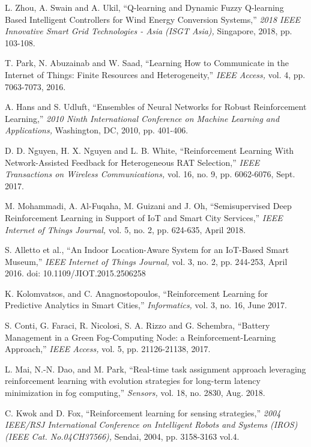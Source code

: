 \documentclass[journal]{IEEEtran}
\begin{document}
\begin{thebibliography}{1}
L. Zhou, A. Swain and A. Ukil, ``Q-learning and Dynamic Fuzzy Q-learning Based Intelligent Controllers for Wind Energy Conversion Systems,'' \emph{2018 IEEE Innovative Smart Grid Technologies - Asia (ISGT Asia),} Singapore, 2018, pp. 103-108.

T. Park, N. Abuzainab and W. Saad, ``Learning How to Communicate in the Internet of Things: Finite Resources and Heterogeneity,'' \emph{IEEE Access,} vol. 4, pp. 7063-7073, 2016.

A. Hans and S. Udluft, ``Ensembles of Neural Networks for Robust Reinforcement Learning,'' \emph{2010 Ninth International Conference on Machine Learning and Applications,} Washington, DC, 2010, pp. 401-406.

D. D. Nguyen, H. X. Nguyen and L. B. White, ``Reinforcement Learning With Network-Assisted Feedback for Heterogeneous RAT Selection,'' \emph{IEEE Transactions on Wireless Communications,} vol. 16, no. 9, pp. 6062-6076, Sept. 2017.

M. Mohammadi, A. Al-Fuqaha, M. Guizani and J. Oh, ``Semisupervised Deep Reinforcement Learning in Support of IoT and Smart City Services,'' \emph{IEEE Internet of Things Journal,} vol. 5, no. 2, pp. 624-635, April 2018.

S. Alletto et al., ``An Indoor Location-Aware System for an IoT-Based Smart Museum,'' \emph{IEEE Internet of Things Journal,} vol. 3, no. 2, pp. 244-253, April 2016.
doi: 10.1109/JIOT.2015.2506258

K. Kolomvatsos, and C. Anagnostopoulos, ``Reinforcement Learning for Predictive Analytics in
Smart Cities,'' \emph{Informatics,} vol. 3, no. 16, June 2017.

S. Conti, G. Faraci, R. Nicolosi, S. A. Rizzo and G. Schembra, ``Battery Management in a Green Fog-Computing Node: a Reinforcement-Learning Approach,'' \emph{IEEE Access,} vol. 5, pp. 21126-21138, 2017.

L. Mai, N.-N. Dao, and M. Park, ``Real-time task assignment approach leveraging reinforcement learning with evolution strategies for long-term latency minimization in fog computing,'' \emph{Sensors,} vol. 18, no. 2830, Aug. 2018.

C. Kwok and D. Fox, ``Reinforcement learning for sensing strategies,'' \emph{2004 IEEE/RSJ International Conference on Intelligent Robots and Systems (IROS) (IEEE Cat. No.04CH37566),} Sendai, 2004, pp. 3158-3163 vol.4.


\end{thebibliography}
\end{document}
